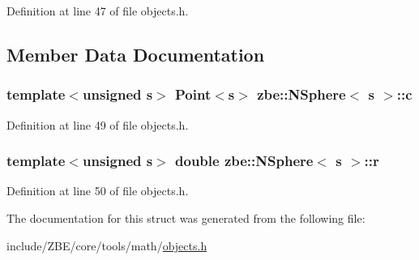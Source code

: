 Definition at line 47 of file objects.\+h.



\subsection{Member Data Documentation}
\hypertarget{structzbe_1_1_n_sphere_a4e3c36d361b729674a9e62e37824339e}{}
\subsubsection[{c}]{\setlength{\rightskip}{0pt plus 5cm}template$<$unsigned s$>$ {\bf Point}$<$s$>$ {\bf zbe\+::\+N\+Sphere}$<$ s $>$\+::c}\label{structzbe_1_1_n_sphere_a4e3c36d361b729674a9e62e37824339e}


Definition at line 49 of file objects.\+h.

\hypertarget{structzbe_1_1_n_sphere_ac8fae694bd80717eec61699b4d5206c6}{}
\subsubsection[{r}]{\setlength{\rightskip}{0pt plus 5cm}template$<$unsigned s$>$ double {\bf zbe\+::\+N\+Sphere}$<$ s $>$\+::r}\label{structzbe_1_1_n_sphere_ac8fae694bd80717eec61699b4d5206c6}


Definition at line 50 of file objects.\+h.



The documentation for this struct was generated from the following file\+:\begin{DoxyCompactItemize}
\item 
include/\+Z\+B\+E/core/tools/math/\hyperlink{objects_8h}{objects.\+h}\end{DoxyCompactItemize}
